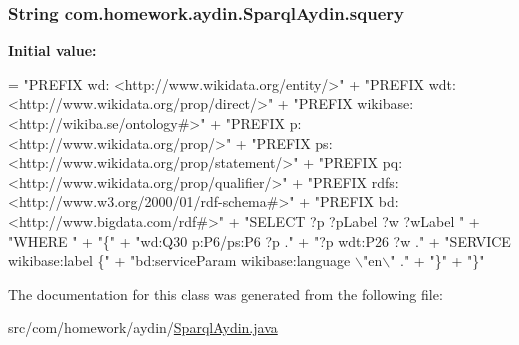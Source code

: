\subsubsection[{\texorpdfstring{squery}{squery}}]{\setlength{\rightskip}{0pt plus 5cm}String com.\+homework.\+aydin.\+Sparql\+Aydin.\+squery\hspace{0.3cm}{\ttfamily [private]}}\hypertarget{classcom_1_1homework_1_1aydin_1_1_sparql_aydin_ace2a9ff0a89fec9f4643590344c57e30}{}\label{classcom_1_1homework_1_1aydin_1_1_sparql_aydin_ace2a9ff0a89fec9f4643590344c57e30}
{\bfseries Initial value\+:}
\begin{DoxyCode}
= \textcolor{stringliteral}{"PREFIX wd: <http://www.wikidata.org/entity/>"}
            + \textcolor{stringliteral}{"PREFIX wdt: <http://www.wikidata.org/prop/direct/>"}
            + \textcolor{stringliteral}{"PREFIX wikibase: <http://wikiba.se/ontology#>"}
            + \textcolor{stringliteral}{"PREFIX p: <http://www.wikidata.org/prop/>"}
            + \textcolor{stringliteral}{"PREFIX ps: <http://www.wikidata.org/prop/statement/>"}
            + \textcolor{stringliteral}{"PREFIX pq: <http://www.wikidata.org/prop/qualifier/>"}
            + \textcolor{stringliteral}{"PREFIX rdfs: <http://www.w3.org/2000/01/rdf-schema#>"}
            + \textcolor{stringliteral}{"PREFIX bd: <http://www.bigdata.com/rdf#>"}
            + \textcolor{stringliteral}{"SELECT ?p ?pLabel ?w ?wLabel "}
            + \textcolor{stringliteral}{"WHERE "}
            + \textcolor{stringliteral}{"\{"}
            + \textcolor{stringliteral}{"wd:Q30 p:P6/ps:P6 ?p ."}
            + \textcolor{stringliteral}{"?p wdt:P26 ?w ."}
            + \textcolor{stringliteral}{"SERVICE wikibase:label \{"}
            + \textcolor{stringliteral}{"bd:serviceParam wikibase:language \(\backslash\)"en\(\backslash\)" ."}
            + \textcolor{stringliteral}{"\}"}
            + \textcolor{stringliteral}{"\}"}
\end{DoxyCode}


The documentation for this class was generated from the following file\+:\begin{DoxyCompactItemize}
\item 
src/com/homework/aydin/\hyperlink{_sparql_aydin_8java}{Sparql\+Aydin.\+java}\end{DoxyCompactItemize}
